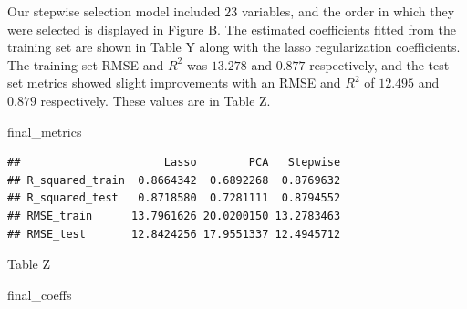 \documentclass[
  11pt,
]{article}
\newenvironment{Shaded}{\begin{snugshade}}{\end{snugshade}}
\newcommand{\NormalTok}[1]{#1}
\begin{document}
Our stepwise selection model included \(23\) variables, and the order in
which they were selected is displayed in Figure B. The estimated
coefficients fitted from the training set are shown in Table Y along
with the lasso regularization coefficients. The training set RMSE and
\(R^2\) was \(13.278\) and \(0.877\) respectively, and the test set
metrics showed slight improvements with an RMSE and \(R^2\) of
\(12.495\) and \(0.879\) respectively. These values are in Table Z.

\begin{Shaded}
\begin{Highlighting}[]
\NormalTok{final_metrics}
\end{Highlighting}
\end{Shaded}

\begin{verbatim}
##                      Lasso        PCA   Stepwise
## R_squared_train  0.8664342  0.6892268  0.8769632
## R_squared_test   0.8718580  0.7281111  0.8794552
## RMSE_train      13.7961626 20.0200150 13.2783463
## RMSE_test       12.8424256 17.9551337 12.4945712
\end{verbatim}

Table Z

\begin{Shaded}
\begin{Highlighting}[]
\NormalTok{final_coeffs}
\end{Highlighting}
\end{Shaded}
\end{document}
